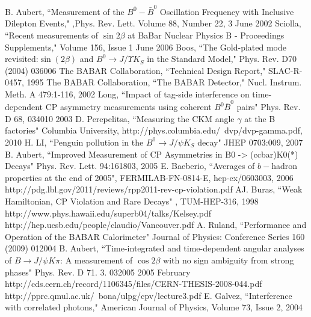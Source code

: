 \documentclass[floatfix,aps,prd,amsmath,amssymb]{revtex4}
\begin{document}
\begin{thebibliography}{10}
B. Aubert, ``Measurement of the $B^{0}-\bar{B}^{0}$ Oscillation Frequency with Inclusive Dilepton Events," ,Phys. Rev. Lett. Volume 88, Number 22, 3 June 2002
Sciolla, ``Recent measurements of $\sin2\beta$ at BaBar Nuclear Physics B - Proceedings Supplements," Volume 156, Issue 1 June 2006
Boos, ``The Gold-plated mode revisited:$\sin(2\beta)$ and $B^{0}\rightarrow J/\Upsilon K_{S}$ in the Standard Model," Phys. Rev. D70 (2004) 036006
The BABAR Collaboration, ``Technical Design Report," SLAC-R-0457, 1995
The BABAR Collaboration, ``The BABAR Detector," Nucl. Instrum. Meth. A 479:1-116, 2002
Long, ``Impact of tag-side interference on time-dependent CP asymmetry measurements using coherent $B^{0} \bar{B}^0$ pairs" Phys. Rev. D 68, 034010 2003
D. Perepelitsa, ``Measuring the CKM angle $\gamma$ at the B factories" Columbia University, http://phys.columbia.edu/~dvp/dvp-gamma.pdf, 2010
H. LI,  ``Penguin pollution in the $B^0 \rightarrow J/\psi K_{S}$ decay" JHEP 0703:009, 2007
B. Aubert, ``Improved Measurement of CP Asymmetries in B0 -> (ccbar)K0(*) Decays" Phys. Rev. Lett. 94:161803, 2005
E. Baeberio, ``Averages of $b-$hadron properties at the end of 2005", FERMILAB-FN-0814-E, hep-ex/0603003, 2006
http://pdg.lbl.gov/2011/reviews/rpp2011-rev-cp-violation.pdf
AJ. Buras,  ``Weak Hamiltonian, CP Violation and Rare Decays" , TUM-HEP-316, 1998
http://www.phys.hawaii.edu/superb04/talks/Kelsey.pdf
http://hep.ucsb.edu/people/claudio/Vancouver.pdf
A. Ruland, ``Performance and Operation of the BABAR Calorimeter" Journal of Physics: Conference Series 160 (2009) 012004
B. Aubert, ``Time-integrated and time-dependent angular analyses of $B\rightarrow J/\psi K\pi$: A measurement of $\cos2\beta$ with no sign ambiguity from strong phases" Phys. Rev. D 71. 3. 032005 2005 February
http://cds.cern.ch/record/1106345/files/CERN-THESIS-2008-044.pdf
http://pprc.qmul.ac.uk/~bona/ulpg/cpv/lecture3.pdf
E. Galvez, ``Interference with correlated photons," American Journal of Physics, Volume 73, Issue 2, 2004


\end{thebibliography}
\end{document}
